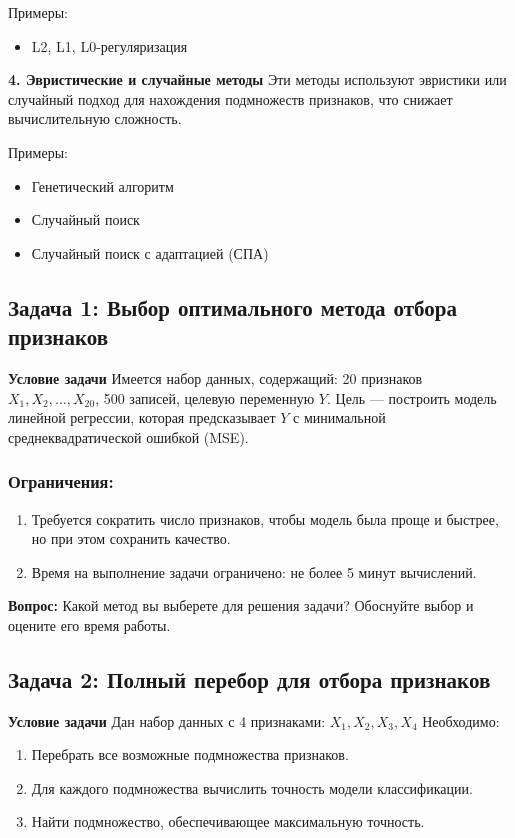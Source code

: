 Примеры:
\begin{itemize}
    \item L2, L1, L0-регуляризация
\end{itemize}

\textbf{4. Эвристические и случайные методы}
Эти методы используют эвристики или случайный подход для нахождения подмножеств признаков, что снижает вычислительную сложность.

Примеры:
\begin{itemize}
    \item Генетический алгоритм
    \item Случайный поиск
    \item Случайный поиск с адаптацией (СПА)
\end{itemize}

\subsection*{Задача 1: Выбор оптимального метода отбора признаков}

\textbf{Условие задачи}
Имеется набор данных, содержащий: 20 признаков \( X_1, X_2, \dots, X_{20} \), 500 записей, целевую переменную \( Y \).
Цель — построить модель линейной регрессии, которая предсказывает \( Y \) с минимальной среднеквадратической ошибкой (MSE).
\subsubsection*{Ограничения:}
\begin{enumerate}
    \item Требуется сократить число признаков, чтобы модель была проще и быстрее, но при этом сохранить качество.
    \item Время на выполнение задачи ограничено: не более 5 минут вычислений.
\end{enumerate}

\textbf{Вопрос:} Какой метод вы выберете для решения задачи? Обоснуйте выбор и оцените его время работы.
\subsection*{Задача 2: Полный перебор для отбора признаков}

\textbf{Условие задачи}
Дан набор данных с 4 признаками: $X_1, X_2, X_3, X_4$
Необходимо:
\begin{enumerate}
    \item Перебрать все возможные подмножества признаков.
    \item Для каждого подмножества вычислить точность модели классификации.
    \item Найти подмножество, обеспечивающее максимальную точность.
\end{enumerate}

